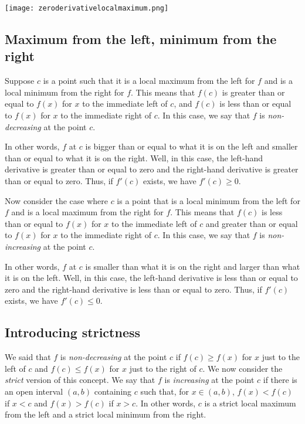 \documentclass{amsart}
\begin{document}
\texttt{[image: zeroderivativelocalmaximum.png]}

\subsection{Maximum from the left, minimum from the right}

Suppose $c$ is a point such that it is a local maximum from the left
for $f$ and is a local minimum from the right for $f$. This means that
$f(c)$ is greater than or equal to $f(x)$ for $x$ to the immediate
left of $c$, and $f(c)$ is less than or equal to $f(x)$ for $x$ to the
immediate right of $c$. In this case, we say that $f$ is {\em
non-decreasing} at the point $c$. 

In other words, $f$ at $c$ is bigger than or equal to what it is on
the left and smaller than or equal to what it is on the right. Well,
in this case, the left-hand derivative is greater than or equal to
zero and the right-hand derivative is greater than or equal to
zero. Thus, if $f'(c)$ exists, we have $f'(c) \ge 0$.

Now consider the case where $c$ is a point that is a local minimum
from the left for $f$ and is a local maximum from the right for
$f$. This means that $f(c)$ is less than or equal to $f(x)$ for $x$ to
the immediate left of $c$ and greater than or equal to $f(x)$ for $x$
to the immediate right of $c$. In this case, we say that $f$ is {\em
non-increasing} at the point $c$.

In other words, $f$ at $c$ is smaller than what it is on the right
and larger than what it is on the left. Well, in this case, the
left-hand derivative is less than or equal to zero and the right-hand
derivative is less than or equal to zero. Thus, if $f'(c)$ exists, we
have $f'(c) \le 0$.

\subsection{Introducing strictness}

We said that $f$ is {\em non-decreasing} at the point $c$ if $f(c) \ge
f(x)$ for $x$ just to the left of $c$ and $f(c) \le f(x)$ for $x$ just
to the right of $c$. We now consider the {\em strict} version of this
concept. We say that $f$ is {\em increasing} at the point $c$ if there
is an open interval $(a,b)$ containing $c$ such that, for $x \in
(a,b)$, $f(x) < f(c)$ if $x < c$ and $f(x) > f(c)$ if $x > c$. In
other words, $c$ is a strict local maximum from the left and a strict
local minimum from the right.
\end{document}
